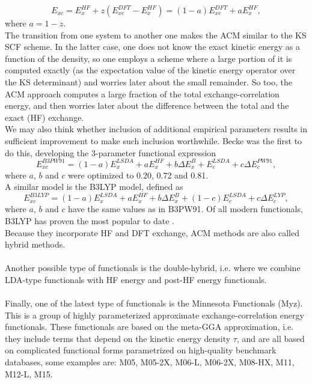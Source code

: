 \begin{equation}
    E_{xc} = E_x^{HF} + z(E_{xc}^{DFT} - E_x^{HF}) = (1-a)E_{xc}^{DFT} + aE_x^{HF},
\end{equation}
where $a = 1-z$. \\
The transition from one system to another one makes the ACM similar to the KS SCF scheme. In the latter case, one does not know the exact kinetic energy as a function of the density, so one employs a scheme where a large portion of it is computed exactly (as the expectation value of the kinetic energy operator over the KS determinant) and worries later about the small remainder. So too, the ACM approach computes a large fraction of the total exchange-correlation energy, and then worries later about the difference between the total and the exact (HF) exchange. \\
We may also think whether inclusion of additional empirical parameters results in sufficient improvement to make such inclusion worthwhile. Becke was the first to do this, developing the 3-parameter functional expression
\begin{equation}
    E_{xc}^{B3PW91} = (1-a)E_x^{LSDA} + aE_x^{HF} + b\Delta E_x^B + E_c^{LSDA} + c\Delta E_c^{PW91},
\end{equation}
where $a$, $b$ and $c$ were optimized to 0.20, 0.72 and 0.81. \\
A similar model is the B3LYP model, defined as
\begin{equation}
    E_{xc}^{B3LYP} = (1-a)E_x^{LSDA} + aE_x^{HF} + b\Delta E_x^B + (1-c)E_c^{LSDA} + c\Delta E_c^{LYP},
\end{equation}
where $a$, $b$ and $c$ have the same values as in B3PW91. Of all modern functionals, B3LYP has proven the most popular to date \cite{Burke2012Apr}. \\
Because they incorporate HF and DFT exchange, ACM methods are also called hybrid
methods. \\
\\
Another possible type of functionals is the double-hybrid, i.e. where we combine LDA-type functionals with HF energy and post-HF energy functionals. \\
\\
Finally, one of the latest type of functionals is the Minnesota Functionals (Myz). This is a group of highly parameterized approximate exchange-correlation energy functionals. These functionals are based on the meta-GGA approximation, i.e. they include terms that depend on the kinetic energy density $\tau$, and are all based on complicated functional forms parametrized on high-quality benchmark databases, some examples are: M05, M05-2X, M06-L, M06-2X, M08-HX, M11, M12-L, M15.

